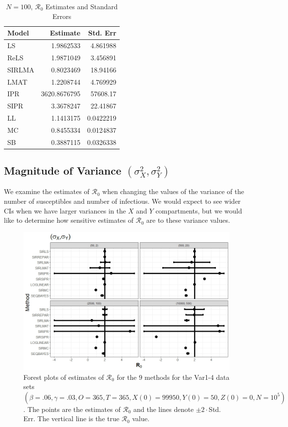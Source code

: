 \documentclass[12pt]{article}
\newcommand{\xxsir}{\ensuremath{9} } %
\newcommand{\rr}{\ensuremath{\mathcal{R}_0}}
\begin{document}
\begin{table}[H]
	
	\centering
	\begin{tabular}[t]{l|r|r}
		\hline
		Model & Estimate & Std. Err\\
		\hline
		LS & 1.9862533 & 4.861988\\
		\hline
		ReLS & 1.9871049 & 3.456891\\
		\hline
		SIRLMA & 0.8023469 & 18.94166\\
		\hline
		LMAT & 1.2208744 & 4.769929\\
		\hline
		IPR & 3620.8676795 & 57608.17\\
		\hline
		SIPR & 3.3678247 & 22.41867\\
		\hline
		LL & 1.1413175 & 0.0422219\\
		\hline
		MC & 0.8455334 & 0.0124837\\
		\hline
		SB & 0.3887115 & 0.0326338\\
		\hline
	\end{tabular}
\caption{$N = 100$, $\rr$ Estimates and Standard Errors}\label{tab:n2-res2}
\end{table}

\subsection{Magnitude of Variance $(\sigma^2_X, \sigma^2_Y)$}\label{sec:res-var}
We examine the estimates of $\rr$ when changing the values of the variance of the number of susceptibles and number of infectious.  We would expect to see wider CIs when we have larger variances in the $X$ and $Y$ compartments, but we would like to determine how sensitive estimates of $\rr$ are to these variance values.


\begin{figure}[H]
\begin{center}
  \includegraphics[scale=0.5]{images/var.jpeg}
  \caption{Forest plots of estimates of $\rr$ for the \xxsir methods for the Var1-4 data sets $(\beta=.06, \gamma=.03, O=365, T=365, X(0)=99950, Y(0)=50, Z(0)=0, N=10^5)$.  The points are the estimates of $\rr$ and the lines denote $\pm 2\cdot $Std. Err.  The vertical line is the true $\rr$ value.}
  \label{fig:mag-var-res}
\end{center}
\end{figure}
\end{document}
